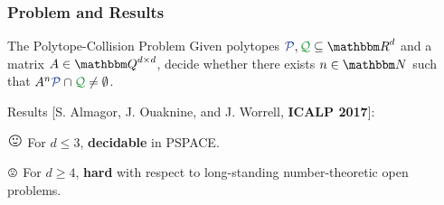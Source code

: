 \begin{frame}
	\frametitle{Problem and Results}
	\pause
	\onslide<+->
	\begin{beamerboxesrounded}[upper=uppercolblue,lower=lowercolblue,shadow=true]{The Polytope-Collision Problem}
		Given polytopes $\colInit{\P}, \colTarget{\Q}\subseteq \RR^d$ and a matrix $A\in \QQ^{d\times d}$, decide whether there exists $n\in \NN$ such that $A^n\colInit{\P}\cap \colTarget{\Q}\neq \emptyset$.
	\end{beamerboxesrounded}
	\onslide<+->
	Results 	[S. Almagor, J. Ouaknine, and J. Worrell, \textbf{ICALP 2017}]:
	\onslide<+->	
	\begin{beamerboxesrounded}[upper=uppercolgreen,lower=lowercolgreen,shadow=true]{$\Large \emc{black}{\smiley}$ }
		For $d\le 3$, {\bf decidable} in PSPACE.
	\end{beamerboxesrounded}	
	\onslide<+->
	\begin{beamerboxesrounded}[upper=uppercolred,lower=lowercolred,shadow=true]{\Large $\emc{black}{\frownie}$}
		For $d\ge 4$, {\bf hard} with respect to long-standing number-theoretic open problems.
	\end{beamerboxesrounded}

\end{frame}


